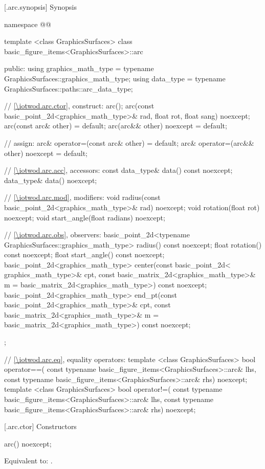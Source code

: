  [\iotwod.arc.synopsis] {Synopsis}
\begin{codeblock}
namespace @\fullnamespace{}@ {
  template <class GraphicsSurfaces>
  class basic_figure_items<GraphicsSurfaces>::arc {
  public:
    using graphics_math_type = typename GraphicsSurfaces::graphics_math_type;
    using data_type =
      typename GraphicsSurfaces::paths::arc_data_type;

    // \ref{\iotwod.arc.ctor}, construct:
    arc();
    arc(const basic_point_2d<graphics_math_type>& rad, float rot, float sang) noexcept;
    arc(const arc& other) = default;
    arc(arc&& other) noexcept = default;

    // assign:
    arc& operator=(const arc& other) = default;
    arc& operator=(arc&& other) noexcept = default;

    // \ref{\iotwod.arc.acc}, accessors:
    const data_type& data() const noexcept;
    data_type& data() noexcept;

    // \ref{\iotwod.arc.mod}, modifiers:
    void radius(const basic_point_2d<graphics_math_type>& rad) noexcept;
    void rotation(float rot) noexcept;
    void start_angle(float radians) noexcept;

    // \ref{\iotwod.arc.obs}, observers:
    basic_point_2d<typename GraphicsSurfaces::graphics_math_type> radius() const noexcept;
    float rotation() const noexcept;
    float start_angle() const noexcept;
    basic_point_2d<graphics_math_type> center(const basic_point_2d< graphics_math_type>& cpt,
      const basic_matrix_2d<graphics_math_type>& m =
        basic_matrix_2d<graphics_math_type>{}) const noexcept;
    basic_point_2d<graphics_math_type> end_pt(const basic_point_2d<graphics_math_type>& cpt,
      const basic_matrix_2d<graphics_math_type>& m =
        basic_matrix_2d<graphics_math_type>{}) const noexcept;
  };

  // \ref{\iotwod.arc.eq}, equality operators:
  template <class GraphicsSurfaces>
  bool operator==(
    const typename basic_figure_items<GraphicsSurfaces>::arc& lhs,
    const typename basic_figure_items<GraphicsSurfaces>::arc& rhs) 
    noexcept;  
  template <class GraphicsSurfaces>
  bool operator!=(
    const typename basic_figure_items<GraphicsSurfaces>::arc& lhs,
    const typename basic_figure_items<GraphicsSurfaces>::arc& rhs) 
    noexcept;  
}
\end{codeblock}

 [\iotwod.arc.ctor] {Constructors}%

%
\begin{itemdecl}
arc() noexcept;
\end{itemdecl}
\begin{itemdescr}
\pnum
\effects Equivalent to: .
\end{itemdescr}

